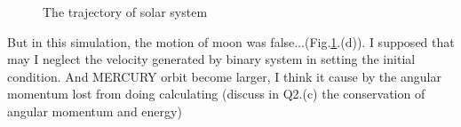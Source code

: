 \documentclass{article}
\begin{document}
\begin{figure}[h]
{        \label{family}
    }
    \caption{The trajectory of solar system}
    \label{fig:4}
\end{figure}

But in this simulation, the motion of moon was false...(Fig.\ref{fig:4}.(d)). I supposed that may I neglect the velocity generated by binary system in setting the initial condition.
And MERCURY orbit become larger, I think it cause by the angular momentum lost from doing calculating (discuss in Q2.(c) the conservation of angular momentum and energy)
\end{document}
